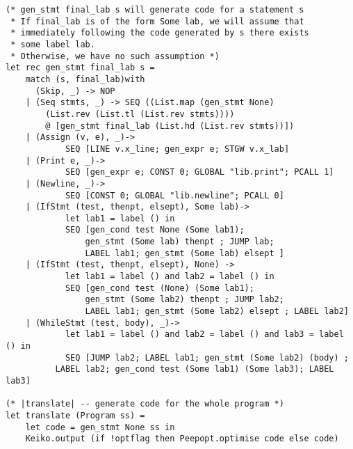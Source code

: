 \begin{lstlisting}[language=Ml]
(* gen_stmt final_lab s will generate code for a statement s
 * If final_lab is of the form Some lab, we will assume that
 * immediately following the code generated by s there exists
 * some label lab.
 * Otherwise, we have no such assumption *)
let rec gen_stmt final_lab s =
    match (s, final_lab)with
      (Skip, _) -> NOP
    | (Seq stmts, _) -> SEQ ((List.map (gen_stmt None)
        (List.rev (List.tl (List.rev stmts))))
        @ [gen_stmt final_lab (List.hd (List.rev stmts))])
    | (Assign (v, e), _)->
            SEQ [LINE v.x_line; gen_expr e; STGW v.x_lab]
    | (Print e, _)->
            SEQ [gen_expr e; CONST 0; GLOBAL "lib.print"; PCALL 1]
    | (Newline, _)->
            SEQ [CONST 0; GLOBAL "lib.newline"; PCALL 0]
    | (IfStmt (test, thenpt, elsept), Some lab)->
            let lab1 = label () in
            SEQ [gen_cond test None (Some lab1); 
                gen_stmt (Some lab) thenpt ; JUMP lab;
                LABEL lab1; gen_stmt (Some lab) elsept ]
    | (IfStmt (test, thenpt, elsept), None) ->
            let lab1 = label () and lab2 = label () in
            SEQ [gen_cond test (None) (Some lab1); 
                gen_stmt (Some lab2) thenpt ; JUMP lab2;
                LABEL lab1; gen_stmt (Some lab2) elsept ; LABEL lab2]
    | (WhileStmt (test, body), _)->
            let lab1 = label () and lab2 = label () and lab3 = label () in
            SEQ [JUMP lab2; LABEL lab1; gen_stmt (Some lab2) (body) ; 
          LABEL lab2; gen_cond test (Some lab1) (Some lab3); LABEL lab3]

(* |translate| -- generate code for the whole program *)
let translate (Program ss) =
    let code = gen_stmt None ss in
    Keiko.output (if !optflag then Peepopt.optimise code else code)
\end{lstlisting}







